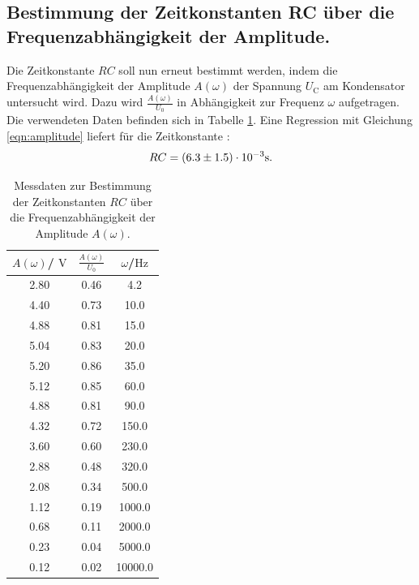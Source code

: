 \subsection{Bestimmung der Zeitkonstanten RC über die Frequenzabhängigkeit der Amplitude.}
Die Zeitkonstante $RC$ soll nun erneut bestimmt werden, indem die Frequenzabhängigkeit der Amplitude $A(\omega)$ der Spannung $U_\text{C}$ am Kondensator untersucht wird.
Dazu wird $\frac{A(\omega)}{U_\text{0}}$ in Abhängigkeit zur Frequenz $\omega$ aufgetragen. Die verwendeten Daten befinden sich in Tabelle \ref{tab:tab2}.
Eine Regression mit Gleichung \eqref{eqn:amplitude} liefert für die Zeitkonstante :
\begin{equation*}
	\centering
	RC=(6.3 \pm 1.5)\cdot 10^{-3} \si{\second} .
\end{equation*}
\begin{table}
	\caption{Messdaten zur Bestimmung der Zeitkonstanten $RC$ über die Frequenzabhängigkeit der Amplitude $A(\omega)$.}
	\label{tab:tab2}
	\centering
	\begin{tabular} {ccc}
		\toprule
		$A(\omega)$/ $\si{\volt}$ & $\frac{A(\omega)}{U_\text{0}}$ & $\omega$/$\si{\Hz}$ \\
		\midrule
		2.80                      & 0.46                           & 4.2                 \\
		4.40                      & 0.73                           & 10.0                \\
		4.88                      & 0.81                           & 15.0                \\
		5.04                      & 0.83                           & 20.0                \\
		5.20                      & 0.86                           & 35.0                \\
		5.12                      & 0.85                           & 60.0                \\
		4.88                      & 0.81                           & 90.0                \\
		4.32                      & 0.72                           & 150.0               \\
		3.60                      & 0.60                           & 230.0               \\
		2.88                      & 0.48                           & 320.0               \\
		2.08                      & 0.34                           & 500.0               \\
		1.12                      & 0.19                           & 1000.0              \\
		0.68                      & 0.11                           & 2000.0              \\
		0.23                      & 0.04                           & 5000.0              \\
		0.12                      & 0.02                           & 10000.0             \\
		\bottomrule
	\end{tabular}
\end{table}

